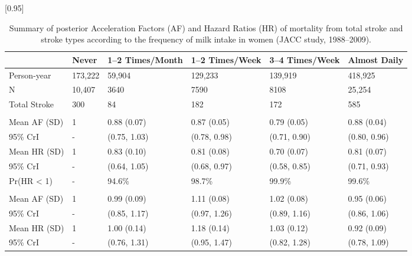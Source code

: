 \documentclass[nutrients,article,accept,moreauthors,pdftex]{Definitions/mdpi}
\begin{document}
\begin{table}[H]

\caption{Summary of posterior Acceleration Factors (AF) and Hazard Ratios (HR) of mortality from total stroke and stroke types according to the frequency of milk intake in women (JACC study, 1988--2009).}
\label{tab:tab3}
\centering
\fontsize{7}{9}\selectfont
\scalebox{.95}[0.95]{\begin{tabular}{L{32mm}C{8mm}C{26mm}C{25mm}C{25mm}C{20mm}}
\textbf{ } & \textbf{Never} & \textbf{1--2 Times/Month} & \textbf{1--2 Times/Week} & \textbf{3--4 Times/Week} & \textbf{Almost Daily}\\
\hline
   Person-year & 173,222 & 59,904 & 129,233 & 139,919 & 418,925\\
N & 10,407 & 3640 & 7590 & 8108 & 25,254\\
   Total Stroke & 300 & 84 & 182 & 172 & 585\\
\addlinespace[0.3em]
\\
\hspace{1em}Mean AF (SD) & 1 & 0.88 (0.07) & 0.87 (0.05) & 0.79 (0.05) & 0.88 (0.04)\\
   \hspace{1em}95\% CrI & - & (0.75, 1.03) & (0.78, 0.98) & (0.71, 0.90) & (0.80, 0.96)\\
\hspace{1em}Mean HR (SD) & 1 & 0.83 (0.10) & 0.81 (0.08) & 0.70 (0.07) & 0.81 (0.07)\\
   \hspace{1em}95\% CrI & - & (0.64, 1.05) & (0.68, 0.97) & (0.58, 0.85) & (0.71, 0.93)\\
\hspace{1em}Pr(HR < 1) & - & 94.6\% & 98.7\% & 99.9\% & 99.6\%\\
\addlinespace[0.3em]
\\
   \hspace{1em}Mean AF (SD) & 1 & 0.99 (0.09) & 1.11 (0.08) & 1.02 (0.08) & 0.95 (0.06)\\
\hspace{1em}95\% CrI & - & (0.85, 1.17) & (0.97, 1.26) & (0.89, 1.16) & (0.86, 1.06)\\
   \hspace{1em}Mean HR (SD) & 1 & 1.00 (0.14) & 1.18 (0.14) & 1.03 (0.12) & 0.92 (0.09)\\
\hspace{1em}95\% CrI & - & (0.76, 1.31) & (0.95, 1.47) & (0.82, 1.28) & (0.78, 1.09)\\

\end{tabular}}
\end{table}
\end{document}
